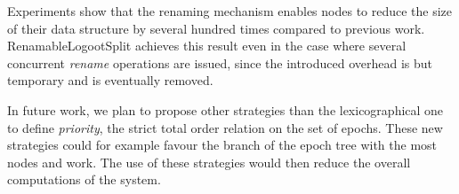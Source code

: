 \documentclass[10pt,journal,compsoc]{IEEEtran}
\begin{document}
Experiments show that the renaming mechanism enables nodes to reduce the size of their data structure by several hundred times compared to previous work.
RenamableLogootSplit achieves this result even in the case where several concurrent \emph{rename} operations are issued, since the introduced overhead is but temporary and is eventually removed.

In future work, we plan to propose other strategies than the lexicographical one to define \emph{priority}, the strict total order relation on the set of epochs.
These new strategies could for example favour the branch of the epoch tree with the most nodes and work.
The use of these strategies would then reduce the overall computations of the system.


%




\ifCLASSOPTIONcaptionsoff
  \newpage
\fi
\end{document}

